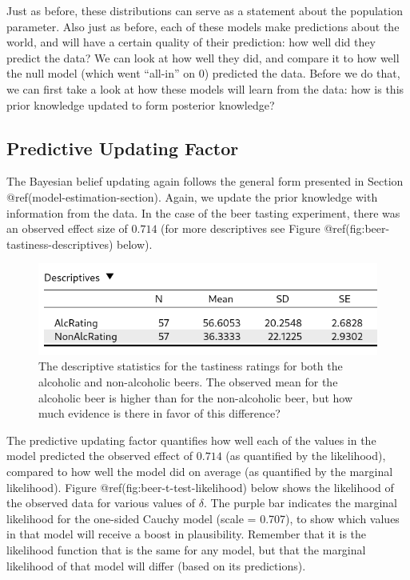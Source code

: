\documentclass[
  letterpaper,
  DIV=11,
  numbers=noendperiod]{scrreprt}
\begin{document}
Just as before, these distributions can serve as a statement about the
population parameter. Also just as before, each of these models make
predictions about the world, and will have a certain quality of their
prediction: how well did they predict the data? We can look at how well
they did, and compare it to how well the null model (which went
``all-in'' on 0) predicted the data. Before we do that, we can first
take a look at how these models will learn from the data: how is this
prior knowledge updated to form posterior knowledge?

\hypertarget{predictive-updating-factor}{%
\subsection{Predictive Updating
Factor}\label{predictive-updating-factor}}

The Bayesian belief updating again follows the general form presented in
Section @ref(model-estimation-section). Again, we update the prior
knowledge with information from the data. In the case of the beer
tasting experiment, there was an observed effect size of \(0.714\) (for
more descriptives see Figure @ref(fig:beer-tastiness-descriptives)
below).

\begin{figure}

{\centering \includegraphics[width=1\textwidth,height=\textheight]{Figures/DescriptivesBeerTastiness.png}

}

\caption{The descriptive statistics for the tastiness ratings for both
the alcoholic and non-alcoholic beers. The observed mean for the
alcoholic beer is higher than for the non-alcoholic beer, but how much
evidence is there in favor of this difference?}

\end{figure}

The predictive updating factor quantifies how well each of the values in
the model predicted the observed effect of \(0.714\) (as quantified by
the likelihood), compared to how well the model did on average (as
quantified by the marginal likelihood). Figure
@ref(fig:beer-t-test-likelihood) below shows the likelihood of the
observed data for various values of \(\delta\). The purple bar indicates
the marginal likelihood for the one-sided Cauchy model (scale = 0.707),
to show which values in that model will receive a boost in plausibility.
Remember that it is the likelihood function that is the same for any
model, but that the marginal likelihood of that model will differ (based
on its predictions).
\end{document}
